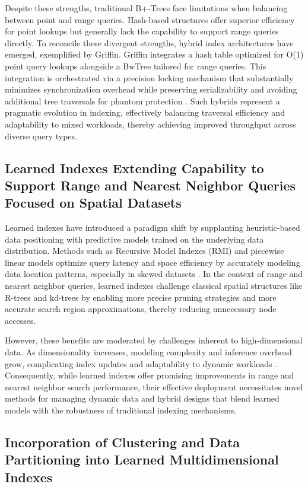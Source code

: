 \documentclass[11pt]{article}
\begin{document}
Despite these strengths, traditional B+-Trees face limitations when balancing between point and range queries. Hash-based structures offer superior efficiency for point lookups but generally lack the capability to support range queries directly. To reconcile these divergent strengths, hybrid index architectures have emerged, exemplified by Griffin. Griffin integrates a hash table optimized for O(1) point query lookups alongside a BwTree tailored for range queries. This integration is orchestrated via a precision locking mechanism that substantially minimizes synchronization overhead while preserving serializability and avoiding additional tree traversals for phantom protection \cite{ref31}. Such hybrids represent a pragmatic evolution in indexing, effectively balancing traversal efficiency and adaptability to mixed workloads, thereby achieving improved throughput across diverse query types.

\subsection{Learned Indexes Extending Capability to Support Range and Nearest Neighbor Queries Focused on Spatial Datasets}

Learned indexes have introduced a paradigm shift by supplanting heuristic-based data positioning with predictive models trained on the underlying data distribution. Methods such as Recursive Model Indexes (RMI) and piecewise linear models optimize query latency and space efficiency by accurately modeling data location patterns, especially in skewed datasets \cite{ref34}. In the context of range and nearest neighbor queries, learned indexes challenge classical spatial structures like R-trees and kd-trees by enabling more precise pruning strategies and more accurate search region approximations, thereby reducing unnecessary node accesses.

However, these benefits are moderated by challenges inherent to high-dimensional data. As dimensionality increases, modeling complexity and inference overhead grow, complicating index updates and adaptability to dynamic workloads \cite{ref34,ref35}. Consequently, while learned indexes offer promising improvements in range and nearest neighbor search performance, their effective deployment necessitates novel methods for managing dynamic data and hybrid designs that blend learned models with the robustness of traditional indexing mechanisms.

\subsection{Incorporation of Clustering and Data Partitioning into Learned Multidimensional Indexes}
\end{document}
